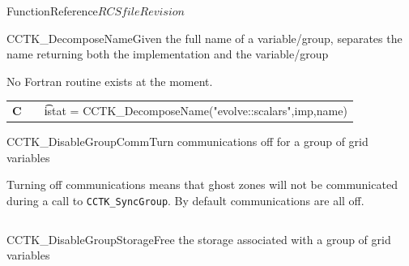 \begin{cactuspart}{FunctionReference}{$RCSfile$}{$Revision$}
\begin{CCTKFunc}{CCTK\_DecomposeName}{Given the full name of a variable/group, separates the name returning both the implementation and the variable/group}
\begin{discussion}
No Fortran routine exists at the moment.
\end{discussion}
\begin{examples}
\begin{tabular}{@{}p{3cm}cp{11cm}}
\hfill {\bf C} && {\t istat = CCTK\_DecomposeName("evolve::scalars",imp,name)}\\
\end{tabular}
\end{examples}
\begin{errorcodes}
\end{errorcodes}
\end{CCTKFunc}


\begin{CCTKFunc}{CCTK\_DisableGroupComm}{Turn communications off for a group of grid variables}
\label{CCTK-DisableGroupComm}
\showcargs
\begin{params}
\end{params}
\begin{discussion}
Turning off communications means that ghost zones will not be
communicated during a call to {\tt CCTK\_SyncGroup}. By default
communications are all off.
\end{discussion}
\begin{examples}
\begin{tabular}{@{}p{3cm}cp{11cm}}
\end{tabular}
\end{examples}
\begin{errorcodes}
\end{errorcodes}
\end{CCTKFunc}

\begin{CCTKFunc}{CCTK\_DisableGroupStorage}{Free the storage associated with a group of grid variables}
\label{CCTK-DisableGroupStorage}
\showcargs
\begin{params}
\end{params}
\begin{discussion}
\end{discussion}
\begin{examples}
\begin{tabular}{@{}p{3cm}cp{11cm}}
\end{tabular}
\end{examples}
\begin{errorcodes}
\end{errorcodes}
\end{CCTKFunc}



\end{cactuspart}
